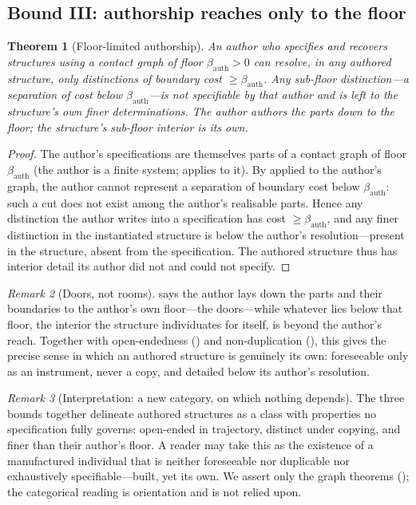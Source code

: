 \documentclass[11pt,a4paper]{article}
\theoremstyle{thmstyle}
\newtheorem{theorem}{Theorem}[section]
\theoremstyle{definition}
\theoremstyle{remark}
\newtheorem{remark}[theorem]{Remark}
\newcommand{\floorc}{\beta}               %
\begin{document}
\subsection{Bound III: authorship reaches only to the floor}

\begin{theorem}[Floor-limited authorship]
\label{thm:floor-limited}
An author who specifies and recovers structures using a contact graph of floor
$\floorc_{\mathrm{auth}}>0$ can resolve, in any authored structure, only
distinctions of boundary cost $\ge\floorc_{\mathrm{auth}}$. Any sub-floor
distinction---a separation of cost below $\floorc_{\mathrm{auth}}$---is not
specifiable by that author and is left to the structure's own finer
determinations. The author authors the parts down to the floor; the structure's
sub-floor interior is its own.
\end{theorem}

\begin{proof}
The author's specifications are themselves parts of a contact graph of floor
$\floorc_{\mathrm{auth}}$ (the author is a finite system; 
applies to it). By  applied to the author's graph, the author
cannot represent a separation of boundary cost below $\floorc_{\mathrm{auth}}$:
such a cut does not exist among the author's realisable parts. Hence any
distinction the author writes into a specification has cost
$\ge\floorc_{\mathrm{auth}}$, and any finer distinction in the instantiated
structure is below the author's resolution---present in the structure, absent
from the specification. The authored structure thus has interior detail its
author did not and could not specify.
\end{proof}

\begin{remark}[Doors, not rooms]
\label{rem:doors}
 says the author lays down the parts and their boundaries
to the author's own floor---the doors---while whatever lies below that floor, the
interior the structure individuates for itself, is beyond the author's reach.
Together with open-endedness \textup{(}\textup{)} and
non-duplication \textup{(}\textup{)}, this gives the precise
sense in which an authored structure is genuinely its own: foreseeable only as an
instrument, never a copy, and detailed below its author's resolution.
\end{remark}

\begin{remark}[Interpretation: a new category, on which nothing depends]
\label{rem:new-category}
The three bounds together delineate authored structures as a class with
properties no specification fully governs: open-ended in trajectory, distinct
under copying, and finer than their author's floor. A reader may take this as the
existence of a manufactured individual that is neither foreseeable nor
duplicable nor exhaustively specifiable---built, yet its own. We assert only the
graph theorems \textup{(}\textup{)}; the categorical reading is orientation and is not
relied upon.
\end{remark}
\end{document}
